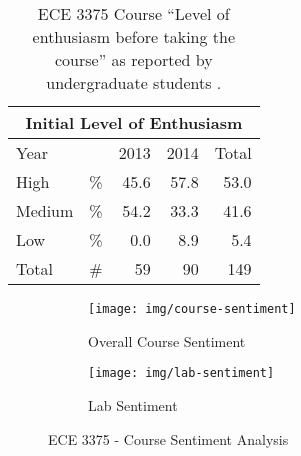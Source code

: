 \begin{table}[hb!]
    \centering
    \begin{tabular}{lc|r|r|r}
        \multicolumn{5}{c}{Initial Level of Enthusiasm} \\ \hline\hline
        \multicolumn{2}{l}{Year} & \multicolumn{1}{|c}{2013} & \multicolumn{1}{|c}{2014} & \multicolumn{1}{|c}{Total} \\ \hline
        High          & \%       & 45.6                     & 57.8                     & 53.0                      \\ 
        Medium        & \%       & 54.2                     & 33.3                     & 41.6                      \\
        Low           & \%       & 0.0                      & 8.9                      & 5.4                       \\ 
        Total         & \#       & 59                       & 90                       & 149                       \\ \hline
    \end{tabular}
    \caption{ECE 3375 Course ``Level of enthusiasm before taking the course'' as reported by undergraduate students \cite{evals:ece3375-2013, evals:ece3375-2014}.} 
    \label{table-course-enthusiasm-ece3375}
\end{table}


\begin{figure}
    \centering
    \begin{subfigure}{.8\linewidth}
        \centering
        \texttt{[image: img/course-sentiment]}
        \caption{Overall Course Sentiment}
        \label{fig:ece-3375-course-sentiment}
    \end{subfigure}
    
    \begin{subfigure}{.8\linewidth}
        \centering
        \texttt{[image: img/lab-sentiment]}
        \caption{Lab Sentiment}
        \label{fig:ece-3375-lab-sentiment}
    \end{subfigure}
    
    \caption{ECE 3375 - Course Sentiment Analysis\cite{evals:ece3375-2013, evals:ece3375-2014}}
\end{figure}

